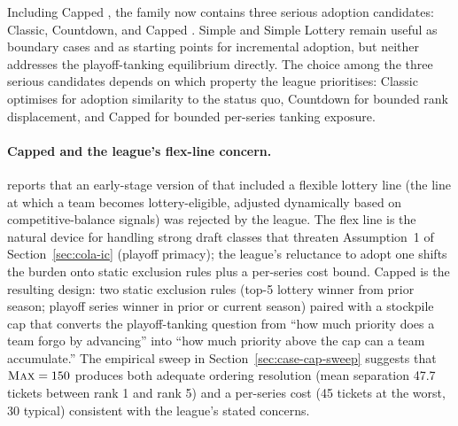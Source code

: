 Including Capped \cola{}, the family now contains three serious adoption candidates: Classic, Countdown, and Capped \cola{}. Simple \cola{} and Simple Lottery \cola{} remain useful as boundary cases and as starting points for incremental adoption, but neither addresses the playoff-tanking equilibrium directly. The choice among the three serious candidates depends on which property the league prioritises: Classic optimises for adoption similarity to the status quo, Countdown for bounded rank displacement, and Capped for bounded per-series tanking exposure.

\paragraph{Capped \cola{} and the league's flex-line concern.} \citet{highley2026solvable5} reports that an early-stage version of \cola{} that included a flexible lottery line (the line at which a team becomes lottery-eligible, adjusted dynamically based on competitive-balance signals) was rejected by the league. The flex line is the natural device for handling strong draft classes that threaten Assumption~1 of Section~\ref{sec:cola-ic} (playoff primacy); the league's reluctance to adopt one shifts the burden onto static exclusion rules plus a per-series cost bound. Capped \cola{} is the resulting design: two static exclusion rules (top-5 lottery winner from prior season; playoff series winner in prior or current season) paired with a stockpile cap that converts the playoff-tanking question from ``how much priority does a team forgo by advancing'' into ``how much priority above the cap can a team accumulate.'' The empirical sweep in Section~\ref{sec:case-cap-sweep} suggests that $\textup{\textsc{Max}} = 150$ produces both adequate ordering resolution (mean separation 47.7 tickets between rank 1 and rank 5) and a per-series cost (45 tickets at the worst, 30 typical) consistent with the league's stated concerns.


